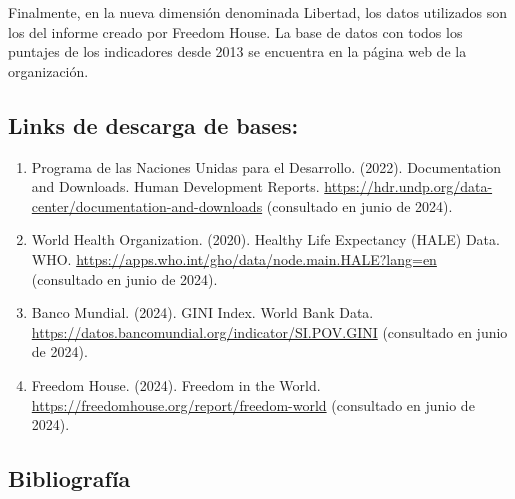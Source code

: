 \documentclass[
  10pt,
]{article}
\begin{document}
Finalmente, en la nueva dimensión denominada Libertad, los datos
utilizados son los del informe creado por Freedom House. La base de
datos con todos los puntajes de los indicadores desde 2013 se encuentra
en la página web de la organización.

\subsection{Links de descarga de
bases:}\label{links-de-descarga-de-bases}

\begin{enumerate}
\def\labelenumi{\arabic{enumi}.}
\item
  Programa de las Naciones Unidas para el Desarrollo. (2022).
  Documentation and Downloads. Human Development Reports.
  \url{https://hdr.undp.org/data-center/documentation-and-downloads}
  (consultado en junio de 2024).
\item
  World Health Organization. (2020). Healthy Life Expectancy (HALE)
  Data. WHO. \url{https://apps.who.int/gho/data/node.main.HALE?lang=en}
  (consultado en junio de 2024).
\item
  Banco Mundial. (2024). GINI Index. World Bank Data.
  \url{https://datos.bancomundial.org/indicator/SI.POV.GINI} (consultado
  en junio de 2024).
\item
  Freedom House. (2024). Freedom in the World.
  \url{https://freedomhouse.org/report/freedom-world} (consultado en
  junio de 2024).
\end{enumerate}

\subsection{Bibliografía}\label{bibliografuxeda}
\end{document}
